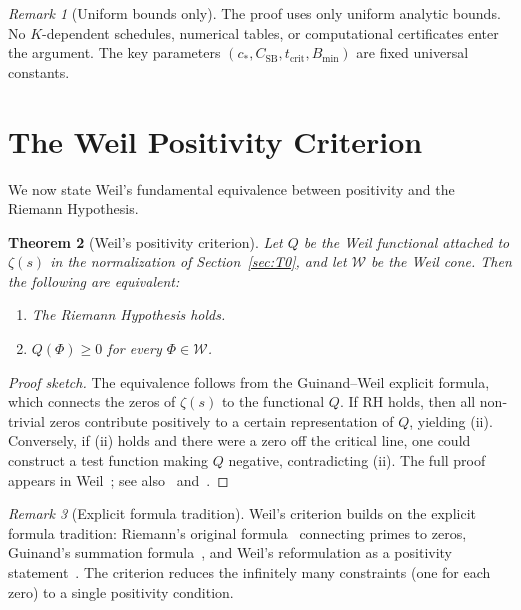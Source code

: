 \documentclass[11pt,a4paper]{article}
\newtheorem{theorem}{Theorem}[section]
\theoremstyle{definition}
\theoremstyle{remark}
\newtheorem{remark}[theorem]{Remark}
\begin{document}
\begin{remark}[Uniform bounds only]\label{rem:uniform}
The proof uses only uniform analytic bounds. No $K$-dependent schedules, numerical tables, or computational certificates enter the argument. The key parameters $(c_*, C_{\mathrm{SB}}, t_{\mathrm{crit}}, B_{\min})$ are fixed universal constants.
\end{remark}

\section{The Weil Positivity Criterion}
\label{sec:weil}

We now state Weil's fundamental equivalence between positivity and the Riemann Hypothesis.

\begin{theorem}[Weil's positivity criterion]\label{thm:weil-criterion}
Let $Q$ be the Weil functional attached to $\zeta(s)$ in the normalization of Section~\ref{sec:T0}, and let $\mathcal{W}$ be the Weil cone. Then the following are equivalent:
\begin{enumerate}[label=\textup{(\roman*)}]
\item The Riemann Hypothesis holds.
\item $Q(\Phi) \geq 0$ for every $\Phi \in \mathcal{W}$.
\end{enumerate}
\end{theorem}

\begin{proof}[Proof sketch]
The equivalence follows from the Guinand--Weil explicit formula, which connects the zeros of $\zeta(s)$ to the functional $Q$. If RH holds, then all non-trivial zeros contribute positively to a certain representation of $Q$, yielding (ii). Conversely, if (ii) holds and there were a zero off the critical line, one could construct a test function making $Q$ negative, contradicting (ii). The full proof appears in Weil~\cite{Weil1952,Weil1972}; see also~\cite[Ch.~5]{Edwards1974} and~\cite[Ch.~5]{IwaniecKowalski2004}.
\end{proof}

\begin{remark}[Explicit formula tradition]\label{rem:explicit}
Weil's criterion builds on the explicit formula tradition: Riemann's original formula~\cite{Riemann1859} connecting primes to zeros, Guinand's summation formula~\cite{Guinand1948}, and Weil's reformulation as a positivity statement~\cite{Weil1952}. The criterion reduces the infinitely many constraints (one for each zero) to a single positivity condition.
\end{remark}
\end{document}
